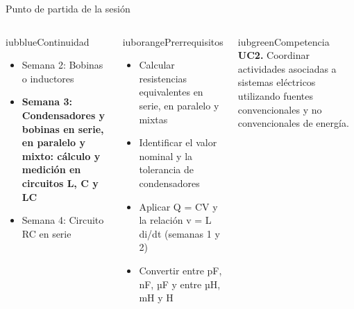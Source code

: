\documentclass[aspectratio=169,11pt,xcolor={table}]{beamer}
\begin{document}
\begin{frame}{Punto de partida de la sesión}
\begin{columns}[T,onlytextwidth]
\begin{caja}[height=5.9cm]{iubblue}{Continuidad}
\scriptsize \begin{itemize}\setlength{\itemsep}{2pt}
  \item Semana 2: Bobinas o inductores
  \item \textbf{Semana 3: Condensadores y bobinas en serie, en paralelo y mixto: cálculo y medición en circuitos L, C y LC}
  \item Semana 4: Circuito RC en serie
\end{itemize}
\end{caja}
\begin{caja}[height=5.9cm]{iuborange}{Prerrequisitos}
\scriptsize \begin{itemize}\setlength{\itemsep}{2pt}
  \item Calcular resistencias equivalentes en serie, en paralelo y mixtas
  \item Identificar el valor nominal y la tolerancia de condensadores
  \item Aplicar Q = CV y la relación v = L di/dt (semanas 1 y 2)
  \item Convertir entre pF, nF, µF y entre µH, mH y H
\end{itemize}
\end{caja}
\begin{caja}[height=5.9cm]{iubgreen}{Competencia}
\scriptsize \textbf{UC2.} Coordinar actividades asociadas a sistemas eléctricos utilizando fuentes convencionales y no convencionales de energía.
\end{caja}
\end{columns}
\end{frame}
\end{document}
